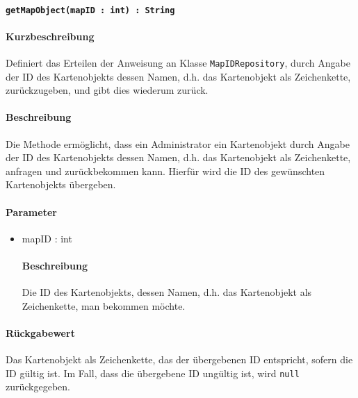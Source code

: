 \paragraph{\texttt{getMapObject(mapID : int) : String}}%
\paragraph*{Kurzbeschreibung}
Definiert das Erteilen der Anweisung an Klasse \texttt{MapIDRepository}, durch Angabe der ID des Kartenobjekts dessen Namen, d.h. das Kartenobjekt als Zeichenkette, zurückzugeben, und gibt dies wiederum zurück.
\paragraph*{Beschreibung}
Die Methode ermöglicht, dass ein Administrator ein Kartenobjekt durch Angabe der ID des Kartenobjekts dessen Namen, d.h. das Kartenobjekt als Zeichenkette, anfragen und zurückbekommen kann.
Hierfür wird die ID des gewünschten Kartenobjekts übergeben.
\paragraph*{Parameter}
\begin{itemize}
    \item mapID : int
    		\paragraph*{Beschreibung}
    		Die ID des Kartenobjekts, dessen Namen, d.h. das Kartenobjekt als Zeichenkette, man bekommen möchte.
\end{itemize}
\paragraph*{Rückgabewert}
Das Kartenobjekt als Zeichenkette, das der übergebenen ID entspricht, sofern die ID gültig ist.
Im Fall, dass die übergebene ID ungültig ist, wird \texttt{null} zurückgegeben.
